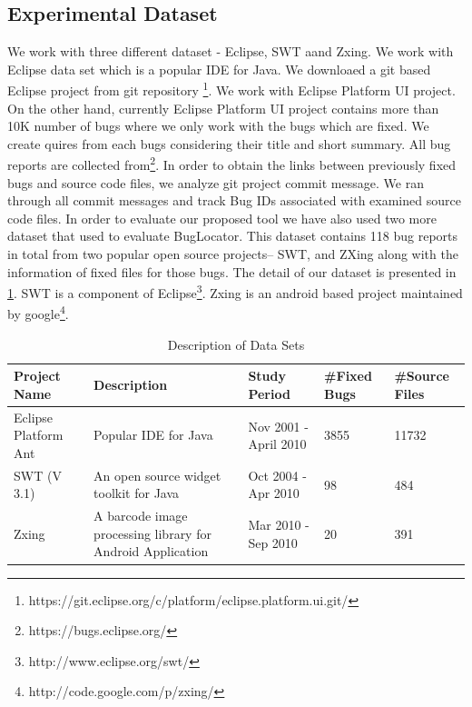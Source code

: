 \documentclass[conference]{IEEEtran}
\begin{document}
\subsection{Experimental Dataset}
We work with three different dataset - Eclipse, SWT aand Zxing.
We work with Eclipse data set which is a popular IDE for Java. We downloaed a git based Eclipse project from git repository \footnote{https://git.eclipse.org/c/platform/eclipse.platform.ui.git/}. We work with Eclipse Platform UI project. 
On the other hand, currently Eclipse Platform UI project contains more than 10K number of bugs where we only work with the bugs which are fixed. We create quires from each bugs considering their title and short summary.
All bug reports are collected from\footnote{https://bugs.eclipse.org/}. In order to obtain the links between previously fixed bugs and source code files, we analyze git project commit message. We ran through all commit messages and track Bug IDs associated with examined source code files. 
In order to evaluate our proposed tool we have also used two more dataset that \citet{Jian} used
to evaluate BugLocator. This dataset contains 118 bug reports in total from two popular open source projects– SWT, and ZXing along with the information of fixed files for those bugs. The detail of our dataset is presented in \ref{tab:DDSl}. SWT is a component of Eclipse\footnote{http://www.eclipse.org/swt/}. Zxing is an android based project maintained by google\footnote{http://code.google.com/p/zxing/}.
\begin{table}[htbp]
	\caption{Description of Data Sets}
	\label{tab:DDSl}
	\begin{center}
		\begin{tabular}{ p{1cm} | p{2.5cm} | p{1.5cm} | p{.75cm} | p{.75cm} }
			\hline
			\textbf{Project Name}  & \textbf{Description} & \textbf{Study Period}& \textbf{\#Fixed Bugs} & \textbf{\#Source Files}\\
			\hline
			{Eclipse Platform Ant} & Popular IDE for Java & Nov 2001 - April 2010 & {3855} & 11732\\ \hline
			SWT (V 3.1)& An open source widget toolkit for Java & Oct 2004 - Apr 2010 & 98 & 484 \\ \hline
			Zxing & A barcode image processing library for Android Application & Mar 2010 - Sep 2010 & 20 & 391 \\
			\hline
			
		\end{tabular}
	\end{center}
\end{table}
\end{document}
